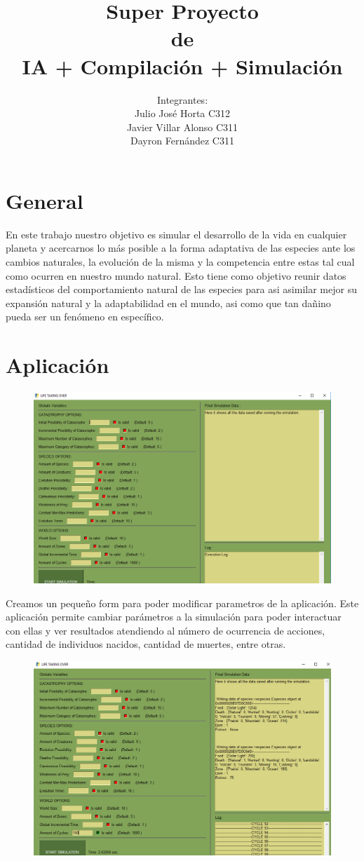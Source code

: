 \documentclass{llncs}
\title{\large\huge Super Proyecto\\de \\ IA + Compilación + Simulación}
\author{Integrantes: \\ Julio José Horta C312 \\Javier Villar Alonso C311 \\ Dayron Fernández C311}
\begin{document}
	
\maketitle

\newpage

\section{General}
En este trabajo nuestro objetivo es simular el desarrollo de la vida en cualquier planeta y acercarnos lo más posible a la forma adaptativa de las especies ante los cambios naturales, la evolución de la misma y la competencia entre estas tal cual como ocurren en nuestro mundo natural.
\newline
\newline
Esto tiene como objetivo reunir datos estadísticos del comportamiento natural de las especies para asi asimilar mejor su expansión natural y la adaptabilidad en el mundo, asi como que tan dañino pueda ser un fenómeno en específico. 


\section{Aplicación}

\begin{figure}
	\centering
	\includegraphics[width=0.7\linewidth]{imagenesapk/HomeForm}
	\caption{}
	\label{fig:homeform}
\end{figure}

Creamos un pequeño form para poder modificar parametros de la aplicación. Este aplicación permite cambiar parámetros a la simulación para poder interactuar con ellas y ver resultados atendiendo al número de ocurrencia de acciones, cantidad de individuos nacidos, cantidad de muertes, entre otras.

\begin{figure}
	\centering
	\includegraphics[width=0.7\linewidth]{imagenesapk/ResultForm}
	\caption{}
	\label{fig:resultform}
\end{figure}
\end{document}

